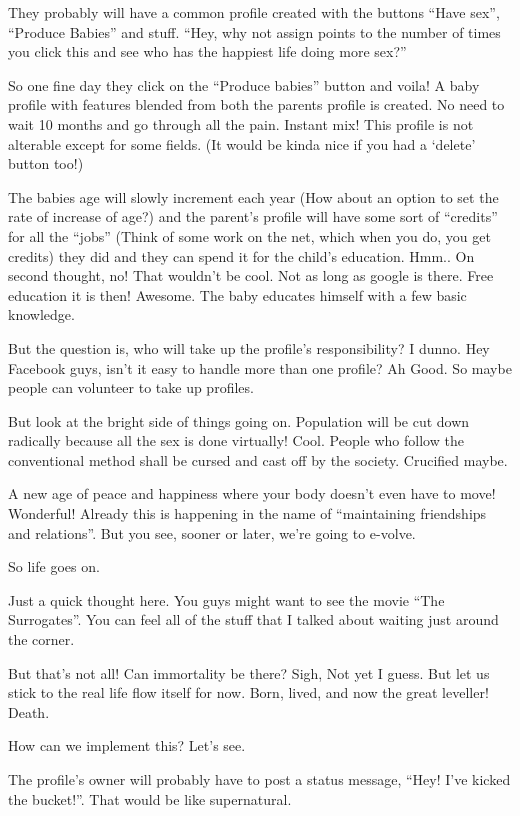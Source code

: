 \documentclass[twoside,11pt,titlepage]{article}
\begin{document}
They probably will have a common profile created with the buttons ``Have sex'', ``Produce Babies'' and stuff. ``Hey, why not assign points to the number of times you click this and see who has the happiest life doing more sex?''

So one fine day they click on the ``Produce babies'' button and voila! A baby profile with features blended from both the parents profile is created. No need to wait 10 months and go through all the pain. Instant mix! This profile is not alterable except for some fields. (It would be kinda nice if you had a `delete' button too!)

The babies age will slowly increment each year (How about an option to set the rate of increase of age?) and the parent's profile will have some sort of ``credits'' for all the ``jobs'' (Think of some work on the net, which when you do, you get credits) they did and they can spend it for the child's education. Hmm.. On second thought, no! That wouldn't be cool. Not as long as google is there. Free education it is then! Awesome. The baby educates himself with a few basic knowledge.

But the question is, who will take up the profile's responsibility? I dunno. Hey Facebook guys, isn't it easy to handle more than one profile? Ah Good. So maybe people can volunteer to take up profiles.

But look at the bright side of things going on. Population will be cut down radically because all the sex is done virtually! Cool. People who follow the conventional method shall be cursed and cast off by the society. Crucified maybe.

A new age of peace and happiness where your body doesn't even have to move! Wonderful! Already this is happening in the name of ``maintaining friendships and relations''. But you see, sooner or later, we're going to e-volve.

So life goes on.

Just a quick thought here. You guys might want to see the movie ``The Surrogates''. You can feel all of the stuff that I talked about waiting just around the corner.

But that's not all! Can immortality be there? Sigh, Not yet I guess. But let us stick to the real life flow itself for now. Born, lived, and now the great leveller! Death.

How can we implement this? Let's see.

The profile's owner will probably have to post a status message, ``Hey! I've kicked the bucket!''. That would be like supernatural.
\end{document}
